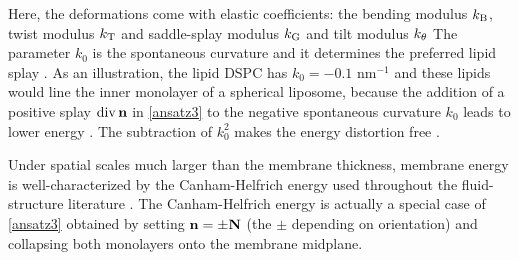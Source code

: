 Here, 
the deformations come with elastic coefficients: the bending modulus $k_{\mathrm{B}}$, twist modulus $k_{\mathrm{T}}$ 
and saddle-splay modulus $k_{\mathrm{G}}$ and tilt modulus $k_{\theta}$
%
The parameter $k_0$ is the  spontaneous curvature and it determines the preferred lipid splay \cite{RoLi15,Kozlov2007}. 
As an illustration, the lipid DSPC has $k_0 = -0.1$ nm$^{-1}$ 
and these lipids would line the  inner monolayer of a 
spherical liposome, because the addition of a positive splay $\operatorname{div} \mathbf{n}$  in \eqref{ansatz3}
to the negative spontaneous curvature $k_0$ leads to lower energy \cite{Kamal22245, C3SM51829A, RoLi15,FriedSeguin15}.
The subtraction of $k_0^2$ makes the energy distortion free
\cite{Helfrich73,PhysRevLett.113.248102,Hamm2000}.

Under spatial scales much larger than the
membrane thickness, membrane energy is well-characterized by the
Canham-Helfrich energy used throughout the fluid-structure literature
\cite{QiangDu09, Lowengrub07,KimLai2010_JCP, Hu, HuLaiSeolEtAl2016_JCP,
  qua-bir2014, qua-vee-you2019}.
The Canham-Helfrich energy is actually a special case of
\eqref{ansatz3} obtained by setting ${\bf n} =  \pm {\bf N}$ (the $\pm$ depending on
orientation) and collapsing both monolayers onto the membrane midplane.



